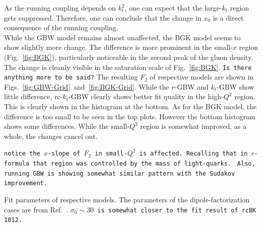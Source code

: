 \documentclass[11pt]{article}
\numberwithin{equation}{section}
\numberwithin{table}{section}
\numberwithin{figure}{section}
\newcommand{\comment}[1]{\texttt{\color{red}#1}}
\begin{document}
As the running coupling depends on $k_t^2$,  one can expect that the large-$k_t$ region gets suppressed.  Therefore, one can conclude that the change in $x_0$ is a direct consequence of the running coupling.\\
While the GBW model remains almost unaffected, the BGK model seems to show slightly more change. The difference is more prominent in the small-$x$ region (Fig.~\ref{fig:BGK}), particularly noticeable in the second peak of the gluon density.
The change is cleanly visible in the saturation scale of Fig.~\ref{fig:BGK}. \comment{Is there anything more to be said?}
The resulting $F_2$ of respective models are shown in Figs.~\ref{fig:GBW-Grid}~and~\ref{fig:BGK-Grid}.
While the $r$-GBW and $k_t$-GBW show little difference, rc-$k_t$-GBW clearly shows better fit quality in the high-$Q^2$ region. This is clearly shown in the histogram at the bottom. 
As for the BGK model, the difference is too small to be seen in the top plots. However the bottom histogram shows some differences. While the small-$Q^2$ region is somewhat improved, as a whole, the changes cancel out. 

\comment{notice the $x$-slope of $F_2$ in small-$Q^2$ is affected. Recalling that in $r$-formula that region was controlled by the mass of light-quarks. }
\comment{Also, running GBW is showing somewhat similar pattern with the Sudakov improvement.}

\begin{table}[t]
\begin{subtable}{\textwidth}
\center\footnotesize

\vspace{2mm}
\end{subtable}
\begin{subtable}{\textwidth}
\center\footnotesize

\vspace{2mm}
\end{subtable}
\caption{Fit parameters of respective models. The parameters of the dipole-factorization cases are from Ref.~\cite{Goda:2022wsc}.
\comment{$\sigma_0\sim30$ is somewhat closer to the fit result of rcBK 1012.}
}
\label{tab:table}
\end{table}
\end{document}
